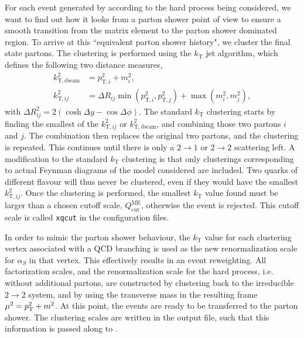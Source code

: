 For each event generated by \MADGRAPH according to the hard process being considered, we want to
find out how it looks from a parton shower point of view to ensure a smooth transition from the
matrix element to the parton shower dominated region.
To arrive at this ``equivalent parton shower history", we cluster the final state partons. 
The clustering is performed using the $k_\text{T}$ jet algorithm, which defines the following two
distance measures,
\begin{align}
  k^2_{\mathrm{T},i\text{beam}} &= p_{\mathrm{T},i}^2 + m_i^2, \\ 
  k^2_{\mathrm{T},ij} &= \Delta R_{ij} \min (p_{\mathrm{T},i}^2 , p_{\mathrm{T},j}^2) + \max (m_i^2,
m_j^2),
\end{align}
with $\Delta R^2_{ij} = 2 (\cosh \Delta y - \cos \Delta\phi)$. The standard $k_\text{T}$ clustering
starts by finding the smallest of the $k^2_{\mathrm{T},ij}$ or $k^2_{\mathrm{T},i\text{beam}}$, and
combining those two partons $i$ and $j$. The combination then replaces the original two partons, and
the clustering is repeated. This continues until there is only a $2 \rightarrow 1$ or $2 \rightarrow
2$ scattering left.
A modification to the standard $k_\text{T}$ clustering is that only clusterings corresponding to
actual Feynman diagrams of the model considered are included. Two quarks of different flavour will
thus never be clustered, even if they would have the smallest $k^2_{\mathrm{T},ij}$. 
Once the clustering is performed, the smallest $k_\mathrm{T}$ value found must be larger than a
chosen cutoff scale, $Q_{\mathrm{cut}}^{\mathrm{ME}}$, otherwise the event is rejected. This cutoff
scale is called \texttt{xqcut} in the \MADGRAPH configuration files. 

In order to mimic the parton shower behaviour, the $k_\mathrm{T}$ value for each clustering vertex
associated with a QCD branching is used as the new renormalization scale for $\alpha_S$ in that
vertex. This effectively results in an event reweighting. 
All factorization scales, and the renormalization scale for the hard process, i.e. without
additional partons, are constructed by clustering back to the irreducible $2 \rightarrow 2$ system,
and by using the transverse mass in the resulting frame $\mu^2 = p_{\mathrm{T}}^2 + m^2$. 
At this point, the events are ready to be transferred to the parton shower. 
The clustering scales are written in the output file, such that this information is passed along to
\PYTHIA. 



